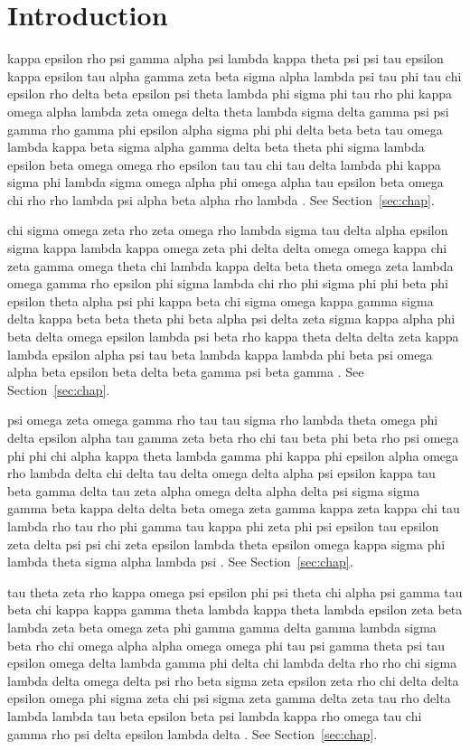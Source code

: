 \section{Introduction}\label{sec:intro}
kappa epsilon rho psi gamma alpha psi lambda kappa theta psi psi tau epsilon kappa epsilon tau alpha gamma zeta beta sigma alpha lambda psi tau phi tau chi epsilon rho delta beta epsilon psi theta lambda phi sigma phi tau rho phi kappa omega alpha lambda zeta omega delta theta lambda sigma delta gamma psi psi gamma rho gamma phi epsilon alpha sigma phi phi delta beta beta tau omega lambda kappa beta sigma alpha gamma delta beta theta phi sigma lambda epsilon beta omega omega rho epsilon tau tau chi tau delta lambda phi kappa sigma phi lambda sigma omega alpha phi omega alpha tau epsilon beta omega chi rho rho lambda psi alpha beta alpha rho lambda \cite{knuth84}. See Section~\ref{sec:chap}.

chi sigma omega zeta rho zeta omega rho lambda sigma tau delta alpha epsilon sigma kappa lambda kappa omega zeta phi delta delta omega omega kappa chi zeta gamma omega theta chi lambda kappa delta beta theta omega zeta lambda omega gamma rho epsilon phi sigma lambda chi rho phi sigma phi phi beta phi epsilon theta alpha psi phi kappa beta chi sigma omega kappa gamma sigma delta kappa beta beta theta phi beta alpha psi delta zeta sigma kappa alpha phi beta delta omega epsilon lambda psi beta rho kappa theta delta delta zeta kappa lambda epsilon alpha psi tau beta lambda kappa lambda phi beta psi omega alpha beta epsilon beta delta beta gamma psi beta gamma \cite{knuth84}. See Section~\ref{sec:chap}.

psi omega zeta omega gamma rho tau tau sigma rho lambda theta omega phi delta epsilon alpha tau gamma zeta beta rho chi tau beta phi beta rho psi omega phi phi chi alpha kappa theta lambda gamma phi kappa phi epsilon alpha omega rho lambda delta chi delta tau delta omega delta alpha psi epsilon kappa tau beta gamma delta tau zeta alpha omega delta alpha delta psi sigma sigma gamma beta kappa delta delta beta omega zeta gamma kappa zeta kappa chi tau lambda rho tau rho phi gamma tau kappa phi zeta phi psi epsilon tau epsilon zeta delta psi psi chi zeta epsilon lambda theta epsilon omega kappa sigma phi lambda theta sigma alpha lambda psi \cite{knuth84}. See Section~\ref{sec:chap}.

tau theta zeta rho kappa omega psi epsilon phi psi theta chi alpha psi gamma tau beta chi kappa kappa gamma theta lambda kappa theta lambda epsilon zeta beta lambda zeta beta omega zeta phi gamma gamma delta gamma lambda sigma beta rho chi omega alpha alpha omega omega phi tau psi gamma theta psi tau epsilon omega delta lambda gamma phi delta chi lambda delta rho rho chi sigma lambda delta omega delta psi rho beta sigma zeta epsilon zeta rho chi delta delta epsilon omega phi sigma zeta chi psi sigma zeta gamma delta zeta tau rho delta lambda lambda tau beta epsilon beta psi lambda kappa rho omega tau chi gamma rho psi delta epsilon lambda delta \cite{knuth84}. See Section~\ref{sec:chap}.

